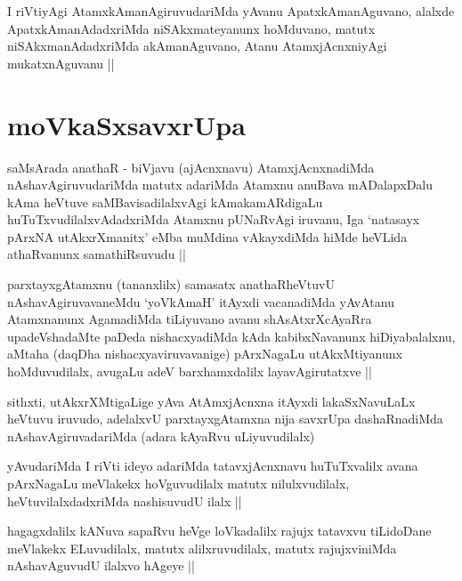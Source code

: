 \begin{artha}
I riVtiyAgi AtamxkAmanAgiruvudariMda yAvanu ApatxkAmanAguvano, alalxde
ApatxkAmanAdadxriMda niSAkxmateyanunx hoMduvano, matutx
niSAkxmanAdadxriMda akAmanAguvano, Atanu AtamxjAcnxniyAgi
mukatxnAguvanu ||
\end{artha}


\section*{moVkaSxsavxrUpa}

\begin{artha}
saMsArada anathaR - biVjavu (ajAcnxnavu) AtamxjAcnxnadiMda
nAshavAgiruvudariMda matutx adariMda Atamxnu anuBava mADalapxDalu kAma
heVtuve saMBavisadilalxvAgi kAmakamARdigaLu huTuTxvudilalxvAdadxriMda
Atamxnu pUNaRvAgi iruvanu, Iga `natasayx pArxNA utAkxrXmanitx' eMba
muMdina vAkayxdiMda hiMde heVLida athaRvanunx samathiRsuvudu ||
\end{artha}

\begin{artha}
parxtayxgAtamxnu (tananxlilx) samasatx anathaRheVtuvU
nAshavAgiruvavaneMdu `yoV\s kAmaH' itAyxdi vacanadiMda yAvAtanu
Atamxnanunx AgamadiMda tiLiyuvano avanu shAsAtxrXcAyaRra
upadeVshadaMte paDeda nishacxyadiMda kAda kabibxNavanunx
hiDiyabalalxnu, aMtaha (daqDha nishacxyaviruvavanige) pArxNagaLu
utAkxMtiyanunx hoMduvudilalx, avugaLu adeV barxhamxdalilx
layavAgirutatxve ||
\end{artha}


\begin{artha}
sithxti, utAkxrXMtigaLige yAva AtAmxjAcnxna itAyxdi lakaSxNavuLaLx
heVtuvu iruvudo, adelalxvU parxtayxgAtamxna nija savxrUpa
dashaRnadiMda nAshavAgiruvadariMda (adara kAyaRvu uLiyuvudilalx)
\end{artha}

\begin{artha}
yAvudariMda I riVti ideyo adariMda tatavxjAcnxnavu huTuTxvalilx avana
pArxNagaLu meVlakekx hoVguvudilalx matutx nilulxvudilalx,
heVtuvilalxdadxriMda nashisuvudU ilalx ||
\end{artha}

\begin{artha}
hagagxdalilx kANuva sapaRvu heVge loVkadalilx rajujx tatavxvu
tiLidoDane meVlakekx ELuvudilalx, matutx alilxruvudilalx, matutx
rajujxviniMda nAshavAguvudU ilalxvo hAgeye ||
\end{artha}


